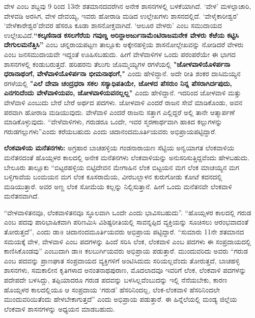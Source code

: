 ವೇಳ ಎಂಬ ಶಬ್ದವು 9 ರಿಂದ 13ನೇ ಶತಮಾನದವರೆಗಿನ ಅನೇಕ ಶಾಸನಗಳಲ್ಲಿ ಬಳಕೆಯಾಗಿದೆ. ‘ವೇಳ’ ಮಳಲ್ಪಾಚಾರಿ, ವೇಳವಡಿ ಅರಸಿಗ, ವೇಳ ದೇವಯ್ಯ, ಇವರು ಹೋರಾಡಿ ಮಡಿದ ಉಲ್ಲೇಖಗಳು ಶಾಸನದಲ್ಲಿದೆ. ‘ವೇಳೈಕಾರೀಶ್ವರ’ ‘ವೇಳೆಕಾರೇಶ್ವರ’ದೇವರ ಹೆಸರೂ ಕೂಡಾ ಶಾಸನೋಕ್ತವಾಗಿದೆ. ‘ಆಲೂರ ವೇಳರು’ ಎಂಬ ಸಮುದಾಯದ ಉಲ್ಲೇಖವಿದೆ.\textbf{“ಕಲ್ಕಣಿನಾಡ ಕಸಲಗೆರೆಯ ಗವುಣ್ಡ ಅರಿನ್ದಾಅರ್ಜುನಾಮೆಂಟಿರಾಜಮನೇಕ ವೇಳರು ಕೆಱೆಯ ಕಟ್ಟಿಸಿ ದೇಗುಲಮನೆತ್ತಿಸಿ”} ಎಂಬ ಚನ್ನರಾಯಪಟ್ಟಣ ತಾಲ್ಲೂಕು ಅಕ್ಕೇನಹಳ್ಳಿಯ ಶಾಸನೋಲ್ಲೇಖವನ್ನು ನೋಡಿದರೆ ವೇಳರು ಎಂಬ ಜನಸಮುದಾಯವೇ ಇದ್ದಂತೆ ಊಹಿಸಬಹುದು. ಹೀಗೆ ವೇಳೆವಾಳಿಗಳ ಒಂದು ಪರಂಪರೆಯೇ ಈ ಭಾಗದ ಶಾಸನಗಳಲ್ಲಿ ಕಂಡುಬರುತ್ತದೆ. ಹರಿಹರನು ತೆಲುಗು ಜೊಮ್ಮಯ್ಯಗಳ ರಗಳೆಯಲ್ಲಿ \textbf{"ಜೋಳವಾಳಿಯೊಳಿರ್ಪನಾ ಧರಾನಾಥಂಗೆ, ವೇಳೆವಾಳಿಯೊಳಿರ್ಪನಾ ಭೀಮನಾಥಂಗೆ,"} ಎಂದು ಹೇಳಿದ್ದಾನೆ. ಅದೇ ರೀತಿ ಶಂಕರ ದಾಸಿಮಯ್ಯನ ರಗಳೆಯಲ್ಲಿ \textbf{"ಎಲೆ ದೇವಾ ಚಂದ್ರಧರಾ ಸಕಲ ಸಸ್ಯಾಧಿಪತಿಯೇ, ಜೋಳದ ಪೆಸರುಂ ನಿನ್ನ ಪೆಸರಾಗಿರ್ದಪುದು, ಎನಗರಿದೆಂದು ವೇಳೆವಾಳಿಯವಂ, ಜೋಳವಾಳಿಯವನಲ್ಲಲ್ಲ"} ಎಂದು ಹೇಳಿದ್ದಾನೆ. ಇದರಿಂದ ಜೋಳವಾಳಿ ಮತ್ತು ವೇಳೆವಾಳಿ ಎಂಬುದು ಬೇರೆ ಬೇರೆ ಅರ್ಥದ ಪದಗಳು. ಜೋಳವಾಳಿ ಎಂದರೆ ರಾಜನ ಸೇವೆ ಮಾಡಿಕೊಂಡು, ಅವನ ಪರವಾಗಿ ಹೋರಾಡಿ ಮಡಿಯುವುದು. ವೇಳೆವಾಳಿ ಎಂದರೆ ರಾಜನು ಸತ್ತಾಗ ಎಲ್ಲಿದ್ದರೆ ಅಲ್ಲಿ ತಾನೇ ಆತ್ಮಾರ್ಪಣೆ ಮಾಡಿಕೊಳ್ಳುವುದು. “ವೇಳೆವಾಳಿಗಳು, ಗರುಡರೂ ಒಂದೇ, ಇವರ ಸ್ಮರಣಾರ್ಥವಾಗಿ ಹಾಕಿದ ಕಲ್ಲುಗಳನ್ನು ಗರುಡಗಲ್ಲುಗಳು”ಎಂದು ಕರೆಯಬಹುದು ಎಂದು ಚಿದಾನಂದಮೂರ್ತಿಯವರು ಅಭಿಪ್ರಾಯಪಟ್ಟಿದ್ದಾರೆ.

\textbf{ಲೆಂಕವಾಳಿಯ ಮನೆತನಗಳು:} ಅಗ್ರಹಾರ ಬಾಚಹಳ್ಳಿಯ ಗಂಡನಾರಾಯಣ ಸೆಟ್ಟಿಯ ಅನ್ವಯಾಗತ ಲೆಂಕವಾಳಿಯ ಮನೆತನದಂತೆ ಹೊಯ್ಸಳರ ಕಾಲದಲ್ಲಿ ಅನೇಕ ಮನೆತನಗಳು ಲೆಂಕವಾಳಿಯನ್ನು ಅನುಸರಿಸುತ್ತಿದ್ದವೆಂದು ಹೇಳಬಹುದು. ಬೇಲೂರು ತಾಲ್ಲೂಕು “ಬಿಟ್ಟರಹಳ್ಳಿಯ ಬಿಟ್ಟಿದೇವನ ಮೇಗಾಹಿನ ಲೆಂಕ ಬಿಟ್ಟಯನ ಮಗ ಲೆಂಕ ಮಾಚಯ್ಯನ ಮಗ ಬಳ್ಳಿಗಾವೆಯ ಬಂಮಯನ ಮಗ ಲೆಂಕ ಕೂಸರಾಮೆಯ, ವೀರಬಲ್ಲಾಳನ ಕುರುಗೋಡು ಕೋಟೆ ಕದನದಲ್ಲಿ ಮಡಿಯುತ್ತಾರೆ. ಅವರ ಅಣ್ಣ ಲೆಂಕ ಸೋಮೆಯ ಕಲ್ಲನ್ನು ನಿಲ್ಲಿಸುತ್ತಾನೆ. ಹೀಗೆ ಒಂದು ಮನೆತನವೇ ಲೆಂಕವಾಳಿ ಮನೆತನವಾಗಿದೆ.

“ವೇಳವಾಳಿತನವೂ, ಲೆಂಕವಾಳಿತನವೂ ಸ್ಥೂಲವಾಗಿ ಒಂದೇ ಎಂದು ಭಾವಿಸಬಹುದು”. “ಹೊಯ್ಸಳರ ಕಾಲದಲ್ಲಿ ಗರುಡ ಎಂಬ ಪದವು ಪಾರಿಭಾಷಿಕವಾಗಿ ಪರಿಣಮಿಸಿ ವಿಶಿಷ್ಟರೀತಿಯಲ್ಲಿ ಸಾವನ್ನಪ್ಪಿದ ವ್ಯಕ್ತಿಯನ್ನು ಸೂಚಿಸಲು ಆರಂಭವಾದಂತೆ ತೋರುತ್ತದೆ”, ಎಂದು ಡಾ॥ ಚಿದಾನಂದಮೂರ್ತಿಯವರು ಅಭಿಪ್ರಾಯ ಪಟ್ಟಿದ್ದಾರೆ. “ಸುಮಾರು 11ನೇ ಶತಮಾನದ ಸಮಯಕ್ಕೆ ವೇಳ, ವೇಳವಾಳಿ ಎಂಬ ಪದಗಳನ್ನು ಹಿಂದೆ ಸರಿಸಿ ಲೆಂಕ, ಲೆಂಕವಾಳಿ ಎಂಬ ಪದಗಳು ಈ ಸಂಪ್ರದಾಯದಲ್ಲಿ ಕಾಣಿಸಿಕೊಂಡವು” ಎಂಬುದಾಗಿ ಡಾ॥ ಕಲಬುರ್ಗಿಯವರು ಅಭಿಪ್ರಾಯ ಪಡುತ್ತಾರೆ. ಮುಂದುವರಿದು ಅವರು “ಗರುಡ ಎಂಬ ಪದವನ್ನು ಪ್ರಾಣಘಾತ ಸಂಪ್ರದಾಯದ ವ್ಯಕ್ತಿಗಳಿಗೆ ಅಂಟಿಸಿದುದು ಸರಿಯಲ್ಲವೆಂದು ತೋರುತ್ತದೆ, ಬಾಚಹಳ್ಳಿ ಶಾಸನಗಳು, ಸಮಕಾಲೀನ ಕೃತಿಗಳಾದ ಅನಂತನಾಥಪುರಾಣ, ಮೊದಲಾದವೂ ಇವರಿಗೆ ಲೆಂಕ, ಲೆಂಕವಾಳಿ ಪದಗಳನ್ನು ಪದೇಪದೇ ಬಳಸಿದ್ದು, ತಪ್ಪಿಯಾದರೂ ಗರುಡ ಪದವನ್ನು ಬಳಸಿಲ್ಲವೆಂಬುದನ್ನು ಇಲ್ಲಿ ನೆನೆಯಬೇಕು, ಕಾರಣ ಹೊಯ್ಸಳರ ಕಾಲದಲ್ಲಿಯೂ ಆ ಸಂಪ್ರದಾಯ ‘ಗರುಡ’ ಹೆಸರಿನಿಂದಲ್ಲ, ಲೆಂಕ-ಲೆಂಕವಾಳಿ ಹೆಸರಿನಿಂದಲೇ ಮುಂದುವರಿಯಿತೆಂದು ಹೇಳಬೇಕಾಗುತ್ತದೆ” ಎಂದು ಅಭಿಪ್ರಾಯ ಪಡುತ್ತಾರೆ. ಈ ಹಿನ್ನೆಲೆಯಲ್ಲಿ ಮಂಡ್ಯ ಜಿಲ್ಲೆಯ ಲೆಂಕವಾಳಿ ಶಾಸನಗಳನ್ನು ಅಧ್ಯಯನ ಮಾಡಬಹುದು.

